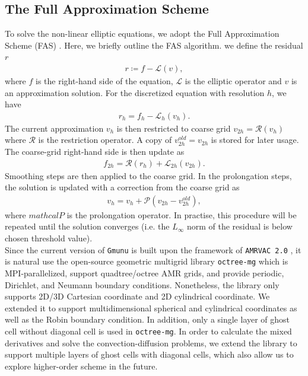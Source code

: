 \subsection{The Full Approximation Scheme} %
\label{section3.1.5}
To solve the non-linear elliptic equations,
we adopt the Full Approximation Scheme (FAS) \cite{brandt1977multi,brabazon2014nonlinear,press1996numerical,cheong2020gmunu,teunissen2019geometric}.
Here, we briefly outline the FAS algorithm.
we define the residual $r$
\begin{align}
    r \coloneqq f - \mathcal{L} \left(v \right),
\end{align}
where $f$ is the right-hand side of the equation, 
$\mathcal{L}$ is the elliptic operator
and $v$ is an approximation solution.
For the discretized equation with resolution $h$, we have
\begin{align}
    r_h = f_h - \mathcal{L}_h \left( v_h \right).
\end{align}
The current approximation $v_h$ is then restricted to coarse grid
$v_{2h} = \mathcal{R} \left( v_h \right)$ where $\mathcal{R}$ is the restriction operator.
A copy of $v^{old}_{2h} = v_{2h}$ is stored for later usage. 
The coarse-grid right-hand side is then update as
\begin{align}
    f_{2h} = \mathcal{R} \left(r_h \right) + \mathcal{L}_{2h} \left(v_{2h} \right).
\end{align}
Smoothing steps are then applied to the coarse grid.
In the prolongation steps,
the solution is updated with a correction from the coarse grid as
\begin{align}
    v_{h} = v_{h} + \mathcal{P} \left(v_{2h} - v^{old}_{2h} \right),
\end{align}
where $mathcal{P}$ is the prolongation operator.
In practise, this procedure will be repeated until the solution converges
(i.e. the $L_\infty$ norm of the residual is below chosen threshold value).\\
Since the current version of \texttt{Gmunu} is built upon the framework of \texttt{AMRVAC 2.0} \cite{xia2018mpi,keppens2021mpi},
it is natural use the open-source geometric multigrid library \texttt{octree-mg} \cite{teunissen2019geometric} 
which is MPI-parallelized, support quadtree/octree AMR grids,
and provide periodic, Dirichlet, and Neumann boundary conditions.
Nonetheless, the library only supports 2D/3D Cartesian coordinate and 2D cylindrical coordinate.
We extended it to support multidimensional spherical and cylindrical coordinates as well as the Robin boundary condition.
In addition, only a single layer of ghost cell without diagonal cell is used in \texttt{octree-mg}.
In order to calculate the mixed derivatives and solve the convection-diffusion problems,
we extend the library to support multiple layers of ghost cells with diagonal cells,
which also allow us to explore higher-order scheme in the future.

